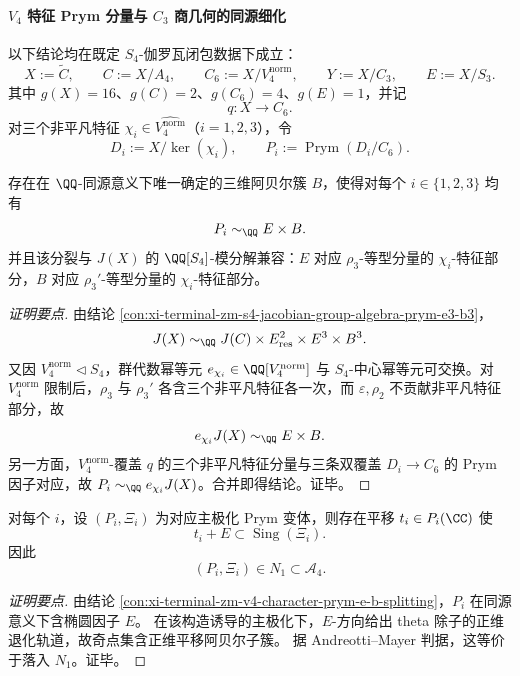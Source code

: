 \paragraph{\texorpdfstring{$V_4$}{V4} 特征 Prym 分量与 \texorpdfstring{$C_3$}{C3} 商几何的同源细化}
以下结论均在既定 \(S_4\)-伽罗瓦闭包数据下成立：
\[
X:=\widetilde{C},\qquad
C:=X/A_4,\qquad
C_6:=X/V_4^{\mathrm{norm}},\qquad
Y:=X/C_3,\qquad
E:=X/S_3.
\]
其中 \(g(X)=16\)、\(g(C)=2\)、\(g(C_6)=4\)、\(g(E)=1\)，并记
\[
q:X\to C_6.
\]
对三个非平凡特征 \(\chi_i\in \widehat{V_4^{\mathrm{norm}}}\)（\(i=1,2,3\)），令
\[
D_i:=X/\ker(\chi_i),\qquad
P_i:=\operatorname{Prym}(D_i/C_6).
\]

\begin{conclusion}\label{con:xi-terminal-zm-v4-character-prym-e-b-splitting}
存在在 \(\QQ\)-同源意义下唯一确定的三维阿贝尔簇 \(B\)，使得对每个 \(i\in\{1,2,3\}\) 均有
\[
P_i\sim_{\QQ}E\times B.
\]
并且该分裂与 \(J(X)\) 的 \(\QQ[S_4]\)-模分解兼容：\(E\) 对应 \(\rho_3\)-等型分量的 \(\chi_i\)-特征部分，\(B\) 对应 \(\rho_3'\)-等型分量的 \(\chi_i\)-特征部分。
\end{conclusion}
\begin{proof}[证明要点]
由结论 \ref{con:xi-terminal-zm-s4-jacobian-group-algebra-prym-e3-b3}，
\[
J(X)\sim_{\QQ}J(C)\times E_{\mathrm{res}}^2\times E^3\times B^3.
\]
又因 \(V_4^{\mathrm{norm}}\triangleleft S_4\)，群代数幂等元 \(e_{\chi_i}\in \QQ[V_4^{\mathrm{norm}}]\) 与 \(S_4\)-中心幂等元可交换。对 \(V_4^{\mathrm{norm}}\) 限制后，\(\rho_3\) 与 \(\rho_3'\) 各含三个非平凡特征各一次，而 \(\varepsilon,\rho_2\) 不贡献非平凡特征部分，故
\[
e_{\chi_i}J(X)\sim_{\QQ}E\times B.
\]
另一方面，\(V_4^{\mathrm{norm}}\)-覆盖 \(q\) 的三个非平凡特征分量与三条双覆盖 \(D_i\to C_6\) 的 Prym 因子对应，故 \(P_i\sim_{\QQ}e_{\chi_i}J(X)\)。合并即得结论。证毕。
\end{proof}

\begin{conclusion}\label{con:xi-terminal-zm-prym-theta-singular-andreotti-mayer}
对每个 \(i\)，设 \((P_i,\Xi_i)\) 为对应主极化 Prym 变体，则存在平移 \(t_i\in P_i(\CC)\) 使
\[
t_i+E\subset \operatorname{Sing}(\Xi_i).
\]
因此
\[
(P_i,\Xi_i)\in N_1\subset \mathcal A_4.
\]
\end{conclusion}
\begin{proof}[证明要点]
由结论 \ref{con:xi-terminal-zm-v4-character-prym-e-b-splitting}，\(P_i\) 在同源意义下含椭圆因子 \(E\)。
在该构造诱导的主极化下，\(E\)-方向给出 theta 除子的正维退化轨道，故奇点集含正维平移阿贝尔子簇。
据 Andreotti--Mayer 判据，这等价于落入 \(N_1\)。证毕。
\end{proof}

